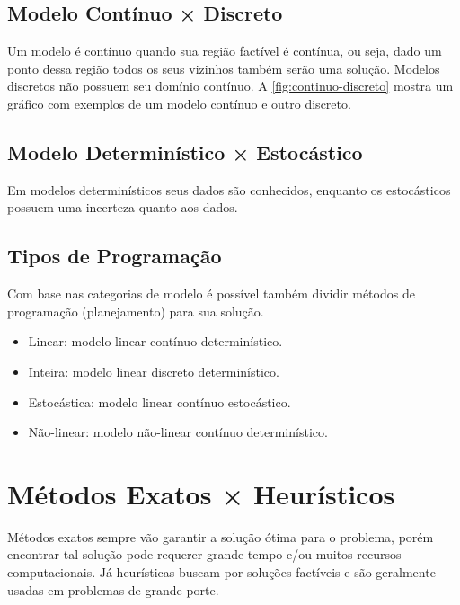 \subsection{Modelo Contínuo × Discreto}\label{subsec:modelo-continuo-x-discreto}

Um modelo é contínuo quando sua região factível é contínua, ou seja, dado um ponto dessa região todos os seus vizinhos também serão uma solução.
Modelos discretos não possuem seu domínio contínuo.
A \autoref{fig:continuo-discreto} mostra um gráfico com exemplos de um modelo contínuo e outro discreto.



\subsection{Modelo Determinístico × Estocástico}\label{subsec:modelo-deterministico-x-estocastico}

Em modelos determinísticos seus dados são conhecidos, enquanto os estocásticos possuem uma incerteza quanto aos dados.

\subsection{Tipos de Programação}\label{subsec:tipos-de-programacao}

Com base nas categorias de modelo é possível também dividir métodos de programação (planejamento) para sua solução.

\begin{itemize}
    \item Linear: modelo linear contínuo determinístico.
    \item Inteira: modelo linear discreto determinístico.
    \item Estocástica: modelo linear contínuo estocástico.
    \item Não-linear: modelo não-linear contínuo determinístico.
\end{itemize}


\section{Métodos Exatos × Heurísticos}\label{sec:metodos-exatos-heuristicos}

Métodos exatos sempre vão garantir a solução ótima para o problema, porém encontrar tal solução pode requerer grande tempo e/ou muitos recursos computacionais.
Já heurísticas buscam por soluções factíveis e são geralmente usadas em problemas de grande porte.

